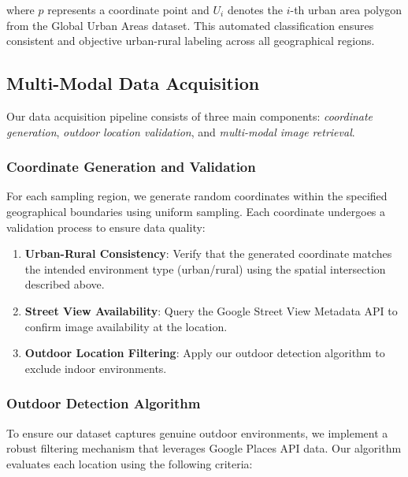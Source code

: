 where $p$ represents a coordinate point and $U_i$ denotes the $i$-th urban area polygon from the Global Urban Areas dataset. This automated classification ensures consistent and objective urban-rural labeling across all geographical regions.

\subsection{Multi-Modal Data Acquisition}

Our data acquisition pipeline consists of three main components: \textit{coordinate generation}, \textit{outdoor location validation}, and \textit{multi-modal image retrieval}.

\subsubsection{Coordinate Generation and Validation}

For each sampling region, we generate random coordinates within the specified geographical boundaries using uniform sampling. Each coordinate undergoes a validation process to ensure data quality:

\begin{enumerate}
    \item \textbf{Urban-Rural Consistency}: Verify that the generated coordinate matches the intended environment type (urban/rural) using the spatial intersection described above.
    \item \textbf{Street View Availability}: Query the Google Street View Metadata API to confirm image availability at the location.
    \item \textbf{Outdoor Location Filtering}: Apply our outdoor detection algorithm to exclude indoor environments.
\end{enumerate}

\subsubsection{Outdoor Detection Algorithm}

To ensure our dataset captures genuine outdoor environments, we implement a robust filtering mechanism that leverages Google Places API data. Our algorithm evaluates each location using the following criteria:

